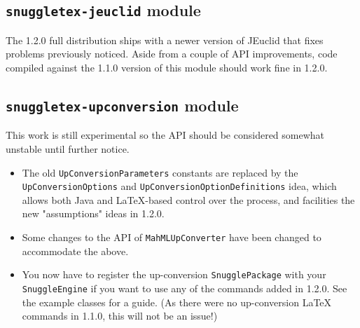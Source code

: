 \subsection*{\verb|snuggletex-jeuclid| module}

The 1.2.0 full distribution ships with a newer version of JEuclid that fixes
problems previously noticed. Aside from a couple of API improvements, code compiled against
the 1.1.0 version of this module should work fine in 1.2.0.
\subsection*{\verb|snuggletex-upconversion| module}

This work is still experimental so the API should be considered somewhat unstable until
further notice.

\begin{itemize}

\item The old \verb|UpConversionParameters| constants are replaced by the
\verb|UpConversionOptions| and \verb|UpConversionOptionDefinitions| idea, which allows
both Java and LaTeX-based control over the process, and facilities the new "assumptions"
ideas in 1.2.0.

\item Some changes to the API of \verb|MahMLUpConverter| have been changed to accommodate
the above.

\item You now have to register the up-conversion \verb|SnugglePackage| with your \verb|SnuggleEngine|
if you want to use any of the commands added in 1.2.0. See the example classes for a guide. (As there
were no up-conversion LaTeX commands in 1.1.0, this will not be an issue!)

\end{itemize}
